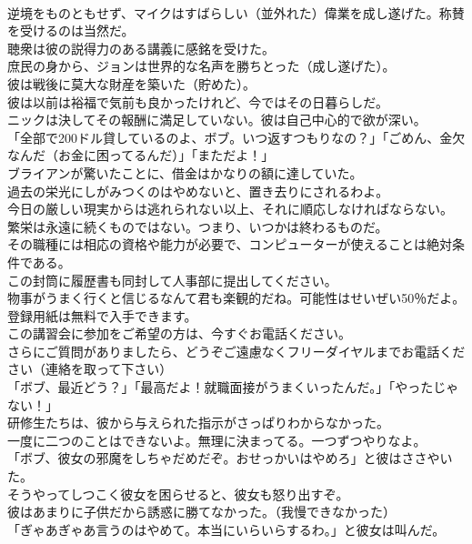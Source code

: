 \documentclass[8pt]{extreport}
\begin{document}
\begin{CJK}{UTF8}{min}
\\	逆境をものともせず、マイクはすばらしい（並外れた）偉業を成し遂げた。称賛を受けるのは当然だ。
\\	聴衆は彼の説得力のある講義に感銘を受けた。
\\	庶民の身から、ジョンは世界的な名声を勝ちとった（成し遂げた）。
\\	彼は戦後に莫大な財産を築いた（貯めた）。
\\	彼は以前は裕福で気前も良かったけれど、今ではその日暮らしだ。
\\	ニックは決してその報酬に満足していない。彼は自己中心的で欲が深い。
\\	「全部で200ドル貸しているのよ、ボブ。いつ返すつもりなの？」「ごめん、金欠なんだ（お金に困ってるんだ）」「まただよ！」
\\	ブライアンが驚いたことに、借金はかなりの額に達していた。
\\	過去の栄光にしがみつくのはやめないと、置き去りにされるわよ。
\\	今日の厳しい現実からは逃れられない以上、それに順応しなければならない。
\\	繁栄は永遠に続くものではない。つまり、いつかは終わるものだ。
\\	その職種には相応の資格や能力が必要で、コンピューターが使えることは絶対条件である。
\\	この封筒に履歴書も同封して人事部に提出してください。
\\	物事がうまく行くと信じるなんて君も楽観的だね。可能性はせいぜい50％だよ。
\\	登録用紙は無料で入手できます。
\\	この講習会に参加をご希望の方は、今すぐお電話ください。
\\	さらにご質問がありましたら、どうぞご遠慮なくフリーダイヤルまでお電話ください（連絡を取って下さい）
\\	「ボブ、最近どう？」「最高だよ！就職面接がうまくいったんだ。」「やったじゃない！」
\\	研修生たちは、彼から与えられた指示がさっぱりわからなかった。
\\	一度に二つのことはできないよ。無理に決まってる。一つずつやりなよ。
\\	「ボブ、彼女の邪魔をしちゃだめだぞ。おせっかいはやめろ」と彼はささやいた。
\\	そうやってしつこく彼女を困らせると、彼女も怒り出すぞ。
\\	彼はあまりに子供だから誘惑に勝てなかった。（我慢できなかった）
\\	「ぎゃあぎゃあ言うのはやめて。本当にいらいらするわ。」と彼女は叫んだ。

\end{CJK}
\end{document}
